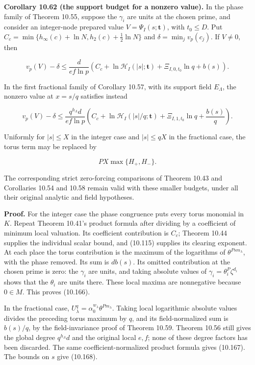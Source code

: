\documentclass[
  11pt,
  a4paper,
]{article}
\newcounter{none} %
\begin{document}
\textbf{Corollary 10.62 (the support budget for a nonzero value).} In
the phase family of Theorem 10.55, suppose the \(\gamma_i\) are units at
the chosen prime, and consider an integer-node prepared value
\(V=\Psi_I(s;\boldsymbol t)\), with \(t_0\le D\). Put
\(C_c=\min\{h_\infty(c)+\ln N,h_2(c)+\tfrac12\ln N\}\) and
\(\delta=\min_jv_p(c_j)\). If \(V\ne0\), then

\[
v_p(V)-\delta\le\frac d{ef\ln p}
\left(C_c+\ln\mathcal H_I(|s|;\boldsymbol t)
+\Xi_{I,0,t_0}\ln q+b(s)\right).
\tag{10.166}
\]

In the first fractional family of Corollary 10.57, with its support
field \(E_\Lambda\), the nonzero value at \(x=s/q\) satisfies instead

\[
v_p(V)-\delta\le\frac{q^{h_\Lambda}d}{ef\ln p}
\left(C_c+\ln\mathcal H_I(|s|/q;\boldsymbol t)
+\Xi_{I,1,t_0}\ln q+\frac{b(s)}q\right).
\tag{10.167}
\]

Uniformly for \(|s|\le X\) in the integer case and \(|s|\le qX\) in the
fractional case, the torus term may be replaced by

\[
PX\max\{H_+,H_-\}.
\tag{10.168}
\]

The corresponding strict zero-forcing comparisons of Theorem 10.43 and
Corollaries 10.54 and 10.58 remain valid with these smaller budgets,
under all their original analytic and field hypotheses.

\textbf{Proof.} For the integer case the phase congruence puts every
torus monomial in \(K\). Repeat Theorem 10.41's product formula after
dividing by a coefficient of minimum local valuation. Its coefficient
contribution is \(C_c\); Theorem 10.44 supplies the individual scalar
bound, and (10.115) supplies its clearing exponent. At each place the
torus contribution is the maximum of the logarithms of
\(\theta^{Ps m_\lambda}\), with the phase removed. Its sum is
\(d b(s)\). Its omitted contribution at the chosen prime is zero: the
\(\gamma_i\) are units, and taking absolute values of
\(\gamma_i=\theta_i^P\zeta^{d_i}\) shows that the \(\theta_i\) are units
there. These local maxima are nonnegative because \(0\in M\). This
proves (10.166).

In the fractional case,
\(U_\lambda^q=\alpha_0^{w_\lambda}\theta^{Pm_\lambda}\). Taking local
logarithmic absolute values divides the preceding torus maximum by
\(q\), and its field-normalized sum is \(b(s)/q\), by the
field-invariance proof of Theorem 10.59. Theorem 10.56 still gives the
global degree \(q^{h_\Lambda}d\) and the original local \(e,f\); none of
these degree factors has been discarded. The same coefficient-normalized
product formula gives (10.167). The bounds on \(s\) give (10.168).
\end{document}
